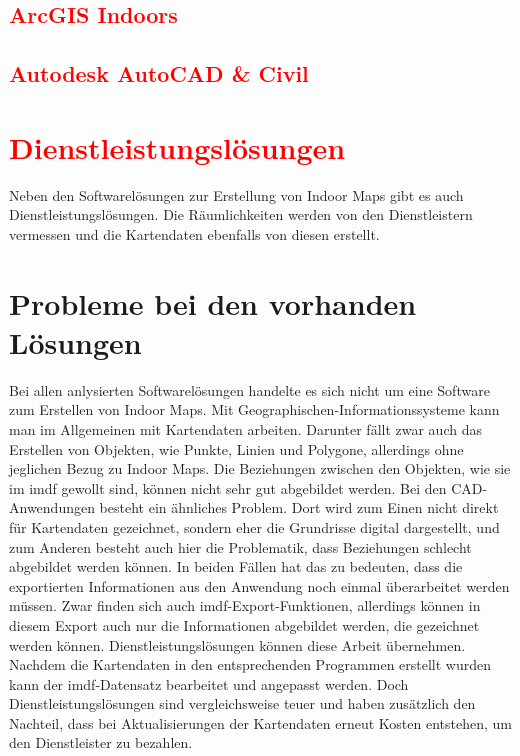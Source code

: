 \subsection{\textcolor{red}{ArcGIS Indoors}}
\analysisresults{}{}{}{}{}

\subsection{\textcolor{red}{Autodesk AutoCAD \& Civil}}
\analysisresults{}{}{}{}{}

\section{\textcolor{red}{Dienstleistungslösungen}}
Neben den Softwarelösungen zur Erstellung von Indoor Maps gibt es auch Dienstleistungslösungen.
Die Räumlichkeiten werden von den Dienstleistern vermessen und die Kartendaten ebenfalls von diesen erstellt.

\section{Probleme bei den vorhanden Lösungen}
Bei allen anlysierten Softwarelösungen handelte es sich nicht um eine Software zum Erstellen von Indoor Maps.
Mit Geographischen-Informationssysteme kann man im Allgemeinen mit Kartendaten arbeiten.
Darunter fällt zwar auch das Erstellen von Objekten, wie Punkte, Linien und Polygone, allerdings ohne jeglichen Bezug zu Indoor Maps.
Die Beziehungen zwischen den Objekten, wie sie im \acl{imdf} gewollt sind, können nicht sehr gut abgebildet werden.
Bei den CAD-Anwendungen besteht ein ähnliches Problem.
Dort wird zum Einen nicht direkt für Kartendaten gezeichnet, sondern eher die Grundrisse digital dargestellt, und zum Anderen besteht auch hier die Problematik, dass Beziehungen schlecht abgebildet werden können.\pbreak%
%
In beiden Fällen hat das zu bedeuten, dass die exportierten Informationen aus den Anwendung noch einmal überarbeitet werden müssen.
Zwar finden sich auch \ac{imdf}-Export-Funktionen, allerdings können in diesem Export auch nur die Informationen abgebildet werden, die gezeichnet werden können.\pbreak%
%
Dienstleistungslösungen können diese Arbeit übernehmen.
Nachdem die Kartendaten in den entsprechenden Programmen erstellt wurden kann der \ac{imdf}-Datensatz bearbeitet und angepasst werden.
Doch Dienstleistungslösungen sind vergleichsweise teuer und haben zusätzlich den Nachteil, dass bei Aktualisierungen der Kartendaten erneut Kosten entstehen, um den Dienstleister zu bezahlen.
